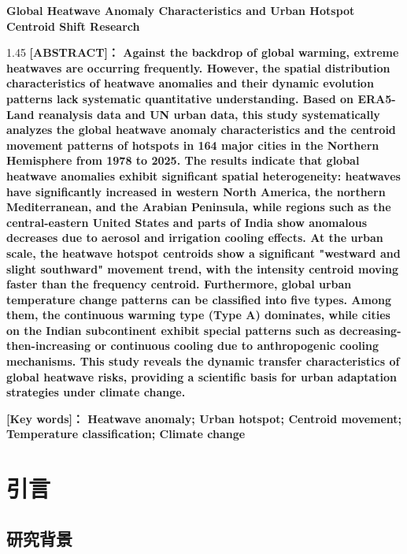\documentclass[a4paper,UTF8,scheme=chinese,zihao=-4,twoside]{ctexart}
\makeatletter
\newcommand{\初号}{\zihao{0}}
\newcommand{\小初}{\zihao{-0}}
\newcommand{\一号}{\zihao{1}}
\newcommand{\小一}{\zihao{-1}}
\newcommand{\二号}{\zihao{2}}
\newcommand{\小二}{\zihao{-2}}
\newcommand{\三号}{\zihao{3}}
\newcommand{\小三}{\zihao{-3}}
\newcommand{\四号}{\zihao{4}}
\newcommand{\小四}{\zihao{-4}}
\newcommand{\五号}{\zihao{5}}
\newcommand{\小五}{\zihao{-5}}
\newcommand{\六号}{\zihao{6}}
\newcommand{\小六}{\zihao{-6}}
\newcommand{\七号}{\zihao{7}}
\newcommand{\八号}{\zihao{8}}
\newcommand{\宋体}{\songti}
\newcommand{\黑体}{\heiti}
\newcommand{\仿宋}{\fangsong}
\newcommand{\楷书}{\kaishu}
\newcommand{\粗体}{\bfseries}
\newcommand{\斜体}{\itshape}
\newcommand\下划线[2][6em]{\hskip1pt\underline{\hb@xt@ #1{\hss#2\hss}}\hskip3pt}
\newcommand{\tTitleEn}{Global Heatwave Anomaly Characteristics and Urban Hotspot Centroid Shift Research}
\newcommand{\tKeywordsEn}{Heatwave anomaly; Urban hotspot; Centroid movement; Temperature classification; Climate change}
\makeatother
\begin{document}
\begin{center}
    \rmfamily\bfseries\二号 \tTitleEn
\end{center}
\vskip 1.5cm
\begin{spacing}{1.45}
    \noindent\rmfamily\bfseries\三号 [ABSTRACT]：
    \rmfamily\四号
    Against the backdrop of global warming, extreme heatwaves are occurring frequently. However, the spatial distribution characteristics of heatwave anomalies and their dynamic evolution patterns lack systematic quantitative understanding. Based on ERA5-Land reanalysis data and UN urban data, this study systematically analyzes the global heatwave anomaly characteristics and the centroid movement patterns of hotspots in 164 major cities in the Northern Hemisphere from 1978 to 2025. The results indicate that global heatwave anomalies exhibit significant spatial heterogeneity: heatwaves have significantly increased in western North America, the northern Mediterranean, and the Arabian Peninsula, while regions such as the central-eastern United States and parts of India show anomalous decreases due to aerosol and irrigation cooling effects. At the urban scale, the heatwave hotspot centroids show a significant "westward and slight southward" movement trend, with the intensity centroid moving faster than the frequency centroid. Furthermore, global urban temperature change patterns can be classified into five types. Among them, the continuous warming type (Type A) dominates, while cities on the Indian subcontinent exhibit special patterns such as decreasing-then-increasing or continuous cooling due to anthropogenic cooling mechanisms. This study reveals the dynamic transfer characteristics of global heatwave risks, providing a scientific basis for urban adaptation strategies under climate change.

    \vfill
    \noindent\rmfamily\bfseries\三号 [Key words]：
    \rmfamily\四号 \tKeywordsEn
\end{spacing}
\clearpage

\tableofcontents
\clearpage

\setcounter{page}{1}

\section{引言}

\subsection{研究背景}
\end{document}
